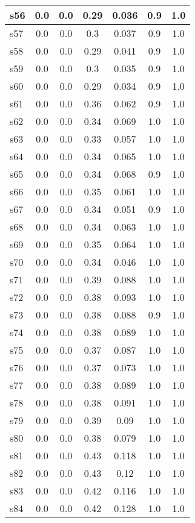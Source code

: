 \documentclass{article}
\begin{document}
\begin{tabular}{|l|c|c|c|c|c|c|}
\hline
s56 &0.0 & 0.0 & 0.29 & 0.036 & 0.9 & 1.0\\
\hline
s57 &0.0 & 0.0 & 0.3 & 0.037 & 0.9 & 1.0\\
\hline
s58 &0.0 & 0.0 & 0.29 & 0.041 & 0.9 & 1.0\\
\hline
s59 &0.0 & 0.0 & 0.3 & 0.035 & 0.9 & 1.0\\
\hline
s60 &0.0 & 0.0 & 0.29 & 0.034 & 0.9 & 1.0\\
\hline
s61 &0.0 & 0.0 & 0.36 & 0.062 & 0.9 & 1.0\\
\hline
s62 &0.0 & 0.0 & 0.34 & 0.069 & 1.0 & 1.0\\
\hline
s63 &0.0 & 0.0 & 0.33 & 0.057 & 1.0 & 1.0\\
\hline
s64 &0.0 & 0.0 & 0.34 & 0.065 & 1.0 & 1.0\\
\hline
s65 &0.0 & 0.0 & 0.34 & 0.068 & 0.9 & 1.0\\
\hline
s66 &0.0 & 0.0 & 0.35 & 0.061 & 1.0 & 1.0\\
\hline
s67 &0.0 & 0.0 & 0.34 & 0.051 & 0.9 & 1.0\\
\hline
s68 &0.0 & 0.0 & 0.34 & 0.063 & 1.0 & 1.0\\
\hline
s69 &0.0 & 0.0 & 0.35 & 0.064 & 1.0 & 1.0\\
\hline
s70 &0.0 & 0.0 & 0.34 & 0.046 & 1.0 & 1.0\\
\hline
s71 &0.0 & 0.0 & 0.39 & 0.088 & 1.0 & 1.0\\
\hline
s72 &0.0 & 0.0 & 0.38 & 0.093 & 1.0 & 1.0\\
\hline
s73 &0.0 & 0.0 & 0.38 & 0.088 & 0.9 & 1.0\\
\hline
s74 &0.0 & 0.0 & 0.38 & 0.089 & 1.0 & 1.0\\
\hline
s75 &0.0 & 0.0 & 0.37 & 0.087 & 1.0 & 1.0\\
\hline
s76 &0.0 & 0.0 & 0.37 & 0.073 & 1.0 & 1.0\\
\hline
s77 &0.0 & 0.0 & 0.38 & 0.089 & 1.0 & 1.0\\
\hline
s78 &0.0 & 0.0 & 0.38 & 0.091 & 1.0 & 1.0\\
\hline
s79 &0.0 & 0.0 & 0.39 & 0.09 & 1.0 & 1.0\\
\hline
s80 &0.0 & 0.0 & 0.38 & 0.079 & 1.0 & 1.0\\
\hline
s81 &0.0 & 0.0 & 0.43 & 0.118 & 1.0 & 1.0\\
\hline
s82 &0.0 & 0.0 & 0.43 & 0.12 & 1.0 & 1.0\\
\hline
s83 &0.0 & 0.0 & 0.42 & 0.116 & 1.0 & 1.0\\
\hline
s84 &0.0 & 0.0 & 0.42 & 0.128 & 1.0 & 1.0\\

\end{tabular}
\end{document}
